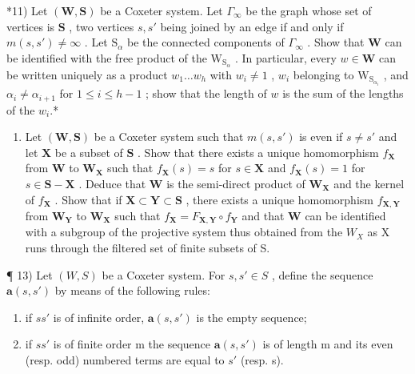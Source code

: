 *11) Let \((\mathbf{W},\mathbf{S})\) be a Coxeter system. Let \(\Gamma_{\infty}\) be the graph whose set of vertices is \(\mathbf{S}\) , two vertices \(s,s'\) being joined by an edge if and only if \(m(s,s')\neq \infty\) . Let \(\mathrm{S}_{\alpha}\) be the connected components of \(\Gamma_{\infty}\) . Show that \(\mathbf{W}\) can be identified with the free product of the \(\mathrm{W}_{\mathrm{S}_{\alpha}}\) . In particular, every \(w\in \mathbf{W}\) can be written uniquely as a product \(w_{1}\ldots w_{h}\) with \(w_{i}\neq 1\) , \(w_{i}\) belonging to \(\mathrm{W}_{\mathrm{S}_{\alpha_i}}\) , and \(\alpha_{i}\neq \alpha_{i + 1}\) for \(1\leqslant i\leqslant h - 1\) ; show that the length of \(w\) is the sum of the lengths of the \(w_i\).*

\begin{enumerate}
\def\labelenumi{\arabic{enumi})}
\setcounter{enumi}{11}
\tightlist
\item
  Let \((\mathbf{W},\mathbf{S})\) be a Coxeter system such that \(m(s,s')\) is even if \(s\neq s'\) and let \(\mathbf{X}\) be a subset of \(\mathbf{S}\) . Show that there exists a unique homomorphism \(f_{\mathbf{X}}\) from \(\mathbf{W}\) to \(\mathbf{W}_{\mathbf{X}}\) such that \(f_{\mathbf{X}}(s) = s\) for \(s\in \mathbf{X}\) and \(f_{\mathbf{X}}(s) = 1\) for \(s\in \mathbf{S} - \mathbf{X}\) . Deduce that \(\mathbf{W}\) is the semi-direct product of \(\mathbf{W}_{\mathbf{X}}\) and the kernel of \(f_{\mathbf{X}}\) . Show that if \(\mathbf{X}\subset \mathbf{Y}\subset \mathbf{S}\) , there exists a unique homomorphism \(f_{\mathbf{X},\mathbf{Y}}\) from \(\mathbf{W}_{\mathbf{Y}}\) to \(\mathbf{W}_{\mathbf{X}}\) such that \(f_{\mathbf{X}} = F_{\mathbf{X},\mathbf{Y}}\circ f_{\mathbf{Y}}\) and that \(\mathbf{W}\) can be identified with a subgroup of the projective system thus obtained from the \(W_{X}\) as X runs through the filtered set of finite subsets of S.
\end{enumerate}

¶ 13) Let \((W, S)\) be a Coxeter system. For \(s, s' \in S\) , define the sequence \(\mathbf{a}(s, s')\) by means of the following rules:

\begin{enumerate}
\def\labelenumi{(\roman{enumi})}
\item
  if \(ss'\) is of infinite order, \(\mathbf{a}(s, s')\) is the empty sequence;
\item
  if \(ss'\) is of finite order m the sequence \(\mathbf{a}(s, s')\) is of length m and its even (resp. odd) numbered terms are equal to \(s'\) (resp. s).
\end{enumerate}

